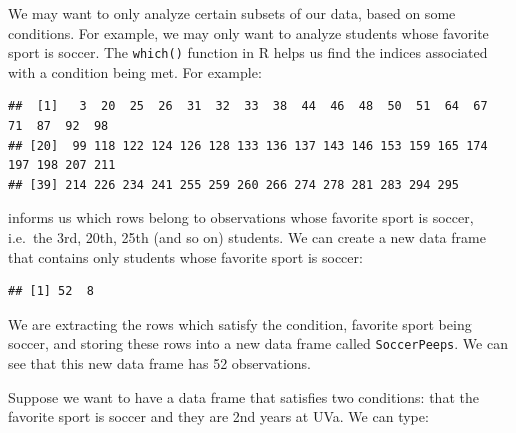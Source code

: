 \documentclass[
]{book}
\newenvironment{Shaded}{\begin{snugshade}}{\end{snugshade}}
\newcommand{\FunctionTok}[1]{\textcolor[rgb]{0.13,0.29,0.53}{\textbf{#1}}}
\newcommand{\NormalTok}[1]{#1}
\newcommand{\OtherTok}[1]{\textcolor[rgb]{0.56,0.35,0.01}{#1}}
\newcommand{\SpecialCharTok}[1]{\textcolor[rgb]{0.81,0.36,0.00}{\textbf{#1}}}
\newcommand{\StringTok}[1]{\textcolor[rgb]{0.31,0.60,0.02}{#1}}
\begin{document}
We may want to only analyze certain subsets of our data, based on some conditions. For example, we may only want to analyze students whose favorite sport is soccer. The \texttt{which()} function in R helps us find the indices associated with a condition being met. For example:

\begin{Shaded}
\end{Shaded}

\begin{verbatim}
##  [1]   3  20  25  26  31  32  33  38  44  46  48  50  51  64  67  71  87  92  98
## [20]  99 118 122 124 126 128 133 136 137 143 146 153 159 165 174 197 198 207 211
## [39] 214 226 234 241 255 259 260 266 274 278 281 283 294 295
\end{verbatim}

informs us which rows belong to observations whose favorite sport is soccer, i.e.~the 3rd, 20th, 25th (and so on) students. We can create a new data frame that contains only students whose favorite sport is soccer:

\begin{Shaded}
\end{Shaded}

\begin{verbatim}
## [1] 52  8
\end{verbatim}

We are extracting the rows which satisfy the condition, favorite sport being soccer, and storing these rows into a new data frame called \texttt{SoccerPeeps}. We can see that this new data frame has 52 observations.

Suppose we want to have a data frame that satisfies two conditions: that the favorite sport is soccer and they are 2nd years at UVa. We can type:

\begin{Shaded}
\end{Shaded}
\end{document}

